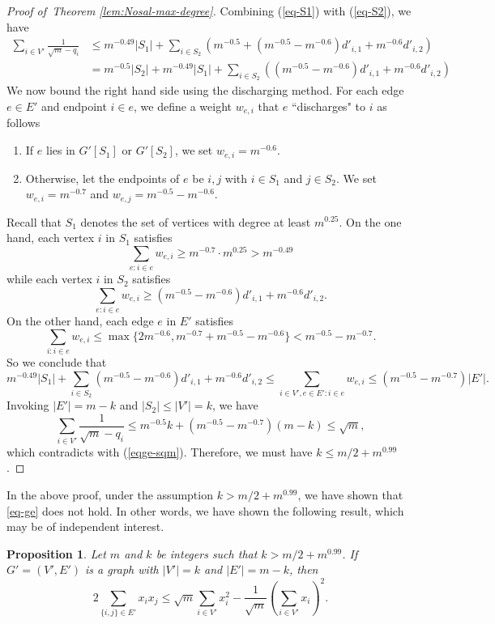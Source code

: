 \documentclass[11pt,a4paper]{article}
\newtheorem{proposition}[theorem]{Proposition}
\theoremstyle{definition}
\theoremstyle{remark}
\newcommand*{\abs}[1]{\lvert#1\rvert}
\begin{document}
\begin{proof}[Proof of~Theorem \ref{lem:Nosal-max-degree}]
Combining (\ref{eq-S1}) with (\ref{eq-S2}), we have
\begin{align*}
 \sum_{i \in V'} \frac{1}{\sqrt{m} - q_i} &\leq m^{-0.49} \abs{S_1} + \sum_{i \in S_2} \left( 
m^{-0.5} + (m^{-0.5} - m^{-0.6}) d'_{i,1} + m^{-0.6} d'_{i,2} \right) \\
&= m^{-0.5} \abs{S_2} + m^{-0.49} \abs{S_1} + \sum_{i \in S_2} \left((m^{-0.5} - m^{-0.6}) d'_{i,1} + m^{-0.6} d'_{i,2} \right)
\end{align*}
We now bound the right hand side using the discharging method. For each edge $e \in E'$ and endpoint $i \in e$, we define a weight $w_{e, i}$ that $e$ ``discharges" to $i$ as follows
\begin{enumerate}
    \item If $e$ lies in $G'[S_1]$ or $G'[S_2]$, we set $w_{e, i} = m^{-0.6}$.
    \item Otherwise, let the endpoints of $e$ be $i, j$ with $i \in S_1$ and $j \in S_2$. We set $w_{e, i} = m^{-0.7}$ and $w_{e, j} = m^{-0.5} - m^{-0.6}$.
\end{enumerate}
Recall that $S_1$ denotes the set of vertices with degree at least $m^{0.25}$.  On the one hand, each vertex $i$ in $S_1$ satisfies
$$\sum_{e: i \in e} w_{e, i} \geq m^{-0.7} \cdot  m^{0.25} > m^{-0.49}$$
while each vertex $i$ in $S_2$ satisfies
$$\sum_{e: i \in e} w_{e, i} \geq (m^{-0.5} - m^{-0.6}) d'_{i,1} + m^{-0.6} d'_{i,2}.$$ 
On the other hand, each edge $e$ in $E'$ satisfies
\[ \sum_{i: i \in e} w_{e, i} \leq \max\{2m^{-0.6}, m^{-0.7} + m^{-0.5} - m^{-0.6}\} < m^{-0.5} - m^{-0.7} .\] 
So we conclude that
$$m^{-0.49} \abs{S_1} + \sum_{i \in S_2} (m^{-0.5} - m^{-0.6}) d'_{i,1} + m^{-0.6} d'_{i,2} 
\leq \sum_{i \in V', e \in E': i \in e} w_{e, i} \leq (m^{-0.5} - m^{-0.7}) \abs{E'}.$$
Invoking $|E'|=m-k$ and $|S_2| 
\le |V'| = k$, 
 we have
$$\sum_{i \in V'} \frac{1}{\sqrt{m} - q_i} \leq m^{-0.5} k + (m^{-0.5} - m^{-0.7})(m - k) \leq \sqrt{m},$$
which contradicts with (\ref{eqge-sqm}). 
Therefore, we must have $k \le m/2 + m^{0.99}$. 
\end{proof}

In the above proof, under the assumption $k> m/2 + m^{0.99}$, 
we have shown that \eqref{eq-ge} does not hold. In other words, we have shown the following result, which may be of independent interest.

\begin{proposition} 
Let $m$ and $k$ be integers such that 
$k>m/2 + m^{0.99}$. 
If $G'=(V',E')$ is a graph with 
$|V'|=k$ and $|E'|=m - k$, then 
$$ 2\sum_{\{i,j\} \in E'} x_i x_j \leq \sqrt{m} \sum_{i \in V'} x_i^2 - \frac{1}{\sqrt{m}} 
\left(\sum_{i \in V'} x_i \right)^2.$$ 
\end{proposition}
\end{document}
